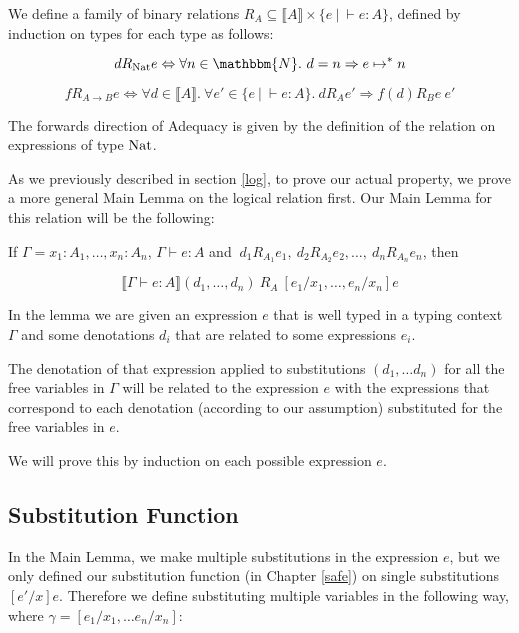 \vspace{0.5cm}

\begin{defn}
We define a family of binary  relations $R_A \subseteq \llbracket A \rrbracket \times \{e \ | \ \vdash e : A \}$, defined by induction on types for each type as follows:

\[ d  R_{\nat}  e \Leftrightarrow \forall n \in \mathbbm{N}. \ d = n \Rightarrow e \mapsto^* n\]

\[f  R_{A \to B}  e \Leftrightarrow \forall d \in \llbracket A \rrbracket. \ \forall e' \in \{ e \ | \ \vdash e : A\}. \ d R_A e' \Rightarrow f(d) R_B  e \ e'\]

\end{defn}

The forwards direction of Adequacy is given by the definition of the relation on expressions of type $\operatorname{Nat}$.

As we previously described in section \ref{log}, to prove our actual property, we prove a more general Main Lemma on the logical relation first. Our Main Lemma for this relation will be the following:

\vspace{0.5cm}

\begin{lem} \label{main}
If $\Gamma = x_1 : A_1, \dots, x_n : A_n$, $\Gamma \vdash e : A$ and $ \ d_1 R_{A_1} e_1, \ d_2 R_{A_2} e_2, \dots , \  d_n   R_{A_n} e_n$, then

\[ \llbracket \Gamma \vdash e : A \rrbracket (d_1, \dots, d_n)  \ R_A \  [e_1/x_1, \dots, e_n/x_n]e \]
\end{lem}

In the lemma we are given an expression $e$ that is well typed in a typing context $\Gamma$ and some denotations $d_i$ that are related to some expressions $e_i$.

The denotation of that expression applied to substitutions $(d_1, \dots d_n)$ for all the  free variables in $\Gamma$ will be related to the expression $e$ with the expressions that correspond to each denotation (according to our assumption) substituted for the free variables in $e$.

We will prove this by induction on each possible expression $e$.

\subsection{Substitution Function}
In the Main Lemma, we make multiple substitutions in the expression $e$, but we only defined our substitution function (in Chapter \ref{safe}) on single substitutions $[e'/x]e$. Therefore we define substituting multiple variables in the following way, where $\gamma = [e_1/x_1, \dots e_n/x_n]$:

